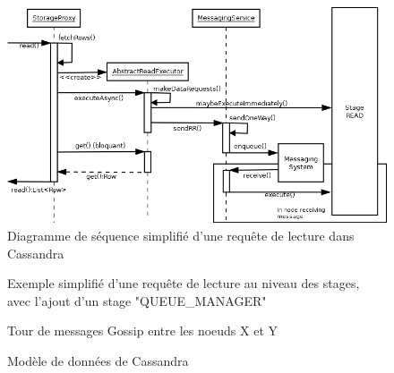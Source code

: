 \documentclass[12pt]{article}
\begin{document}
\begin{figure}[p]
	\centering
		\includegraphics[width=15cm]{schemas/read_diagram.png}
	\caption{Diagramme de séquence simplifié d'une requête de lecture dans Cassandra \label{fig:read_diagram}}
\end{figure}

\begin{figure}[p]
	\centering
		
	\caption{Exemple simplifié d'une requête de lecture au niveau des stages, avec l'ajout d'un stage "QUEUE\_MANAGER" \label{fig:read_request}}
\end{figure}

\begin{figure}[p]
	\centering
		
	\caption{Tour de messages Gossip entre les noeuds X et Y \label{fig:round_gossip}}
\end{figure}

\begin{figure}[p]
	\centering
		
	\caption{Modèle de données de Cassandra \label{fig:keyspace}}
\end{figure}
\end{document}
